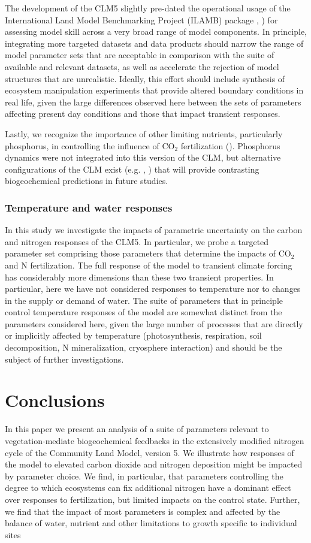 \documentclass[draft,linenumbers]{agujournal}
\begin{document}
The development of the CLM5 slightly pre-dated the operational usage of the International Land Model Benchmarking Project (ILAMB) package \cite{collier2018}, \cite{lawrence2018}) for assessing model skill across a very broad range of model components.  In principle, integrating more targeted datasets and data products should narrow the range of model parameter sets that are acceptable in comparison with the suite of available and relevant datasets, as well as accelerate the rejection of model structures that are unrealistic. Ideally, this effort should include synthesis of ecosystem manipulation experiments that provide altered boundary conditions in real life, given the large differences observed here between the sets of parameters affecting present day conditions and those that impact transient responses.

Lastly, we recognize the importance of other limiting nutrients, particularly phosphorus, in controlling the influence of CO$_{2}$ fertilization (\cite{reed2015}). Phosphorus dynamics were not integrated into this version of the CLM, but alternative configurations of the CLM exist (e.g. \cite{yang2014}, \cite{zhu2016}) that will provide contrasting biogeochemical predictions in future studies.  

\subsubsection{Temperature and water responses}
In this study we investigate the impacts of parametric uncertainty on the carbon and nitrogen responses of the CLM5. In particular, we probe a targeted parameter set comprising those parameters that determine the impacts of CO$_{2}$ and N fertilization. The full response of the model to transient climate forcing has considerably more dimensions than these two transient properties. In particular, here we have not considered responses to temperature nor to changes in the supply or demand of water. The suite of parameters that in principle control temperature responses of the model are somewhat distinct from the parameters considered here, given the large number of processes that are directly or implicitly affected by temperature (photosynthesis, respiration, soil decomposition, N mineralization, cryosphere interaction) and should be the subject of further investigations. 

\section{Conclusions}
In this paper we present an analysis of a suite of parameters relevant to vegetation-mediate biogeochemical feedbacks in the extensively modified nitrogen cycle of the Community Land Model, version 5. We illustrate how responses of the model to elevated carbon dioxide and nitrogen deposition might be impacted by parameter choice. We find, in particular, that parameters controlling the degree to which ecosystems can fix additional nitrogen have a dominant effect over responses to fertilization, but limited impacts on the control state. Further, we find that the impact of most parameters is complex and affected by the balance of water, nutrient and other limitations to growth specific to individual sites
\end{document}
